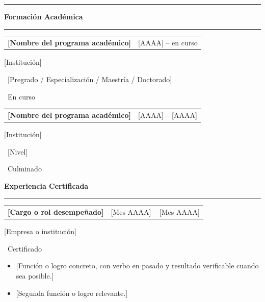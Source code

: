 \documentclass[10pt, letterpaper]{article}
\makeatletter
\newcommand{\SeccionCV}[1]{%
  \needspace{3\baselineskip}%
  \vspace{1.0em}%
  \noindent{\textcolor{AzulITM}{\rule{2.4mm}{2.4mm}}}\hspace{0.5em}%
  {\FuenteTitulo\large\color{AzulITM}\bfseries #1}\\[0.2em]%
  {\color{AzulDigital}\rule{\linewidth}{1.1pt}}%
  \vspace{0.4em}%
}
\newcommand{\ItemCV}[2]{%
  \par\noindent\begin{tabularx}{\linewidth}{@{}X r@{}}
    {\FuenteTitulo\normalsize\color{GrisPizarra}\bfseries #1} &
    {\FuenteCodigo\small\color{GrisMedio}#2}\\
  \end{tabularx}\par\vspace{0.1em}%
}
\newcommand{\NivelFormacion}[1]{%
  \colorbox{AzulITM!12}{\color{AzulITM}\small\bfseries\strut\ #1\ }}
\newcommand{\FormacionEnCurso}{%
  \colorbox{AzulDigital!15}{\color{AzulDigital!70!black}\small\bfseries\strut\ En curso\ }}
\newcommand{\FormacionCulminada}{%
  \colorbox{VerdeTarea!15}{\color{VerdeTarea}\small\bfseries\strut\ Culminado\ }}
\newcommand{\Certificado}{%
  \colorbox{VerdeTarea!15}{\color{VerdeTarea}\small\bfseries\strut\ Certificado\ }}
\makeatother
\begin{document}
\vspace{0.3em}
{\color{GrisLinea}\rule{\linewidth}{0.6pt}}


\SeccionCV{Formación Académica}

\ItemCV{[Nombre del programa académico]}{[AAAA] -- en curso}
[Institución]\quad\NivelFormacion{[Pregrado / Especialización / Maestría / Doctorado]}\quad\FormacionEnCurso

\vspace{0.7em}

\ItemCV{[Nombre del programa académico]}{[AAAA] -- [AAAA]}
[Institución]\quad\NivelFormacion{[Nivel]}\quad\FormacionCulminada


\SeccionCV{Experiencia Certificada}

\ItemCV{[Cargo o rol desempeñado]}{[Mes AAAA] -- [Mes AAAA]}
[Empresa o institución]\quad\Certificado
\begin{itemize}
  \item{} [Función o logro concreto, con verbo en pasado y resultado
        verificable cuando sea posible.]
  \item{} [Segunda función o logro relevante.]
\end{itemize}

\vspace{0.5em}
\end{document}
